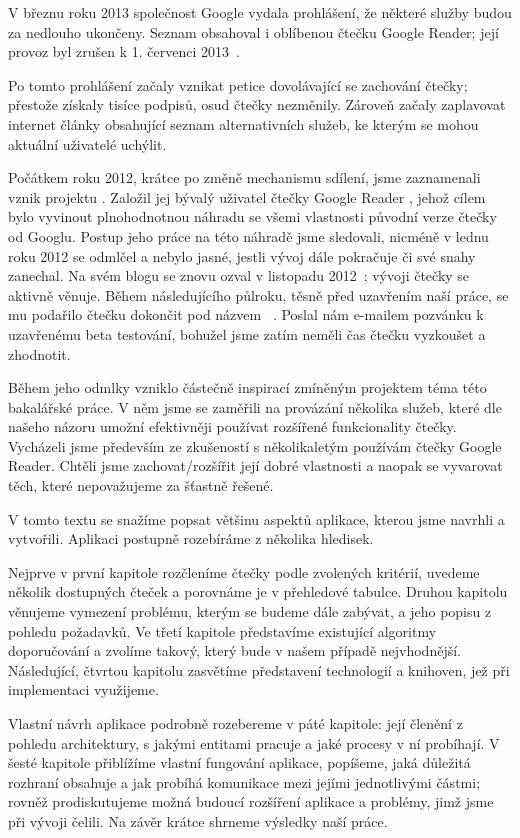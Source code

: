 
V březnu roku 2013 společnost Google vydala prohlášení, že některé služby budou za nedlouho ukončeny.
Seznam obsahoval i oblíbenou čtečku Google Reader; její provoz byl zrušen k 1. červenci 2013~\cite{google-reader-down}.

Po tomto prohlášení začaly vznikat petice dovolávající se zachování čtečky; přestože získaly tisíce podpisů, osud čtečky nezměnily.
Zároveň začaly zaplavovat internet články obsahující seznam alternativních služeb, ke kterým se mohou aktuální uživatelé uchýlit.


Počátkem roku 2012, krátce po změně mechanismu sdílení, jsme zaznamenali vznik projektu .
Založil jej bývalý uživatel čtečky Google Reader , jehož cílem bylo vyvinout plnohodnotnou náhradu se všemi vlastnosti původní verze čtečky od Googlu.
Postup jeho práce na této náhradě jsme sledovali, nicméně v lednu roku 2012 se odmlčel a nebylo jasné, jestli vývoj dále pokračuje či své snahy zanechal.
Na svém blogu se znovu ozval v listopadu 2012~\cite{hivemined-1-year-ago}; vývoji čtečky se aktivně věnuje.
Během následujícího půlroku, těsně před uzavřením naší práce, se mu podařilo čtečku dokončit pod názvem ~\cite{hivemined-launched}.
Poslal nám e-mailem pozvánku k uzavřenému beta testování, bohužel jsme zatím neměli čas čtečku vyzkoušet a zhodnotit.

Během jeho odmlky vzniklo částečně inspirací zmíněným projektem téma této bakalářské práce.
V něm jsme se zaměřili na provázání několika služeb, které dle našeho názoru umožní efektivněji používat rozšířené funkcionality čtečky.
Vycházeli jsme především ze zkušeností s několikaletým používám čtečky Google Reader.
Chtěli jsme zachovat/rozšířit její dobré vlastnosti a naopak se vyvarovat těch, které nepovažujeme za šťastně řešené.


V tomto textu se snažíme popsat většinu aspektů aplikace, kterou jsme navrhli a vytvořili.
Aplikaci postupně rozebíráme z několika hledisek.

Nejprve v první kapitole rozčleníme čtečky podle zvolených kritérií, uvedeme několik dostupných čteček a porovnáme je v přehledové tabulce.
Druhou kapitolu věnujeme vymezení problému, kterým se budeme dále zabývat, a jeho popisu z pohledu požadavků.
Ve třetí kapitole představíme existující algoritmy doporučování a zvolíme takový, který bude v našem případě nejvhodnější.
Následující, čtvrtou kapitolu zasvětíme představení technologií a knihoven, jež při implementaci využijeme.

Vlastní návrh aplikace podrobně rozebereme v páté kapitole: její členění z pohledu architektury, s jakými entitami pracuje a jaké procesy v ní probíhají.
V šesté kapitole přiblížíme vlastní fungování aplikace, popíšeme, jaká důležitá rozhraní obsahuje a jak probíhá komunikace mezi jejími jednotlivými částmi; rovněž prodiskutujeme možná budoucí rozšíření aplikace a problémy, jimž jsme při vývoji čelili.
Na závěr krátce shrneme výsledky naší práce.
